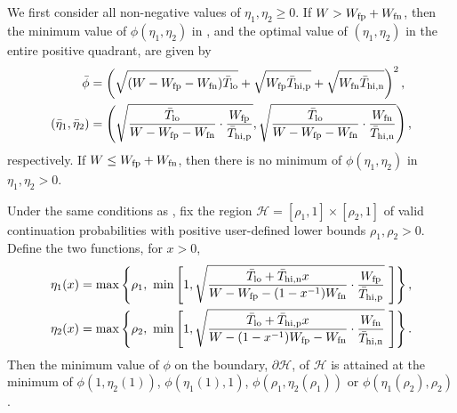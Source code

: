 \documentclass[review,demo]{siamonline190516}
\begin{document}
\begin{lemma}
\label{etastar:unbounded}
 We first consider all non-negative values of $\eta_1, \eta_2 \geq 0$. 
 If $W > W_{\mathrm{fp}} + W_{\mathrm{fn}}$, then the minimum value of $\phi(\eta_1,\eta_2)$ in , and the optimal value of $(\eta_1, \eta_2)$ in the entire positive quadrant, are given by
 \begin{subequations}
 \label{eq:etastar:unbounded}
 \begin{align}
  \bar \phi &= \left( \sqrt{(W - W_{\mathrm{fp}} - W_{\mathrm{fn}}) \bar T_{\mathrm{lo}}} + \sqrt{W_{\mathrm{fp}} \bar T_{\mathrm{hi, p}}} + \sqrt{W_{\mathrm{fn}} \bar T_{\mathrm{hi, n}}} \right)^2, \\
  \left( \bar \eta_1, \bar \eta_2 \right) &= \left( 
  	\sqrt{ \frac{\bar T_{\mathrm{lo}}}{W - W_{\mathrm{fp}} - W_{\mathrm{fn}}} \cdot \frac{W_{\mathrm{fp}}}{\bar T_{\mathrm{hi, p}} }},
	\sqrt{ \frac{\bar T_{\mathrm{lo}}}{W - W_{\mathrm{fp}} - W_{\mathrm{fn}}} \cdot \frac{W_{\mathrm{fn}}}{\bar T_{\mathrm{hi, n}} }}
  \right),
 \end{align}
 \end{subequations}
 respectively.
 If $W \leq W_{\mathrm{fp}} + W_{\mathrm{fn}}$, then there is no minimum of $\phi(\eta_1,\eta_2)$ in $\eta_1, \eta_2 > 0$.
\end{lemma}

\begin{lemma}
\label{etastar:boundary} 
 Under the same conditions as , fix the region $\mathcal H = [\rho_1, 1] \times [\rho_2, 1]$ of valid continuation probabilities with positive user-defined lower bounds $\rho_1, \rho_2 > 0$.
Define the two functions, for $x>0$,
\begin{subequations}
\label{eq:etastar:boundary}
\begin{align}
\eta_1(x) &= \max \left\{ \rho_1, ~\min \left[ 1, 
\sqrt{\frac{\bar T_{\mathrm{lo}} + \bar T_{\mathrm{hi}, \mathrm{n}} x }{W - W_{\mathrm{fp}} - (1-x^{-1})W_{\mathrm{fn}}} \cdot \frac{W_{\mathrm{fp}}}{\bar T_{\mathrm{hi}, \mathrm p}}} ~
\right] \right\}, \\
\eta_2(x) &= \max \left\{ \rho_2, ~\min \left[ 1, 
\sqrt{\frac{\bar T_{\mathrm{lo}} + \bar T_{\mathrm{hi}, \mathrm{p}} x }{W - (1-x^{-1}) W_{\mathrm{fp}} - W_{\mathrm{fn}}} \cdot \frac{W_{\mathrm{fn}}}{\bar T_{\mathrm{hi}, \mathrm n}}} ~
 \right] \right\}.
\end{align}
\end{subequations}
Then the minimum value of $\phi$ on the boundary, $\partial \mathcal H$, of $\mathcal H$ is attained at the minimum of $\phi(1, \eta_2(1))$, $\phi(\eta_1(1), 1)$, $\phi(\rho_1, \eta_2(\rho_1))$ or $\phi(\eta_1(\rho_2), \rho_2)$.
\end{lemma}
 
\end{document}
